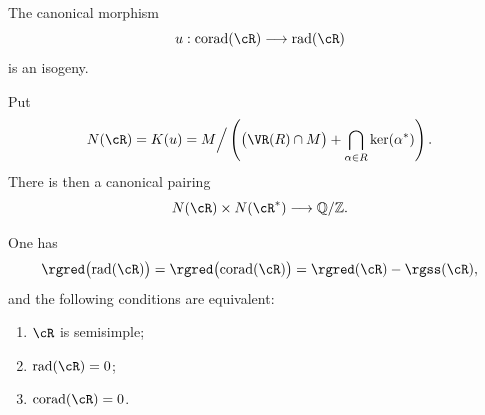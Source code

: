 \begin{lemma}\label{sga3:XXI:6.3.4}
The canonical morphism
\[
 u:\operatorname{corad}(\cR)\longrightarrow\operatorname{rad}(\cR)
\]
is an isogeny.
\end{lemma}

\begin{definition}\label{sga3:XXI:6.3.5}
Put
\[
 N(\cR)=K(u)
 =
 M\Big/
 \left(
   \bigl(\VR(R)\cap M\bigr)
   +\bigcap_{\alpha\in R}\ker(\alpha^\ast)
 \right).
\]
There is then a canonical pairing
\[
 N(\cR)\times N(\cR^\ast)\longrightarrow\mathbb Q/\mathbb Z.
\]
\end{definition}

\begin{lemma}\label{sga3:XXI:6.3.6}
One has
\[
 \rgred\bigl(\operatorname{rad}(\cR)\bigr)
 =
 \rgred\bigl(\operatorname{corad}(\cR)\bigr)
 =
 \rgred(\cR)-\rgss(\cR),
\]
and the following conditions are equivalent:
\begin{enumerate}
\item[(i)] \(\cR\) is semisimple;
\item[(ii)] \(\operatorname{rad}(\cR)=0\);
\item[(iii)] \(\operatorname{corad}(\cR)=0\).
\end{enumerate}
\end{lemma}

